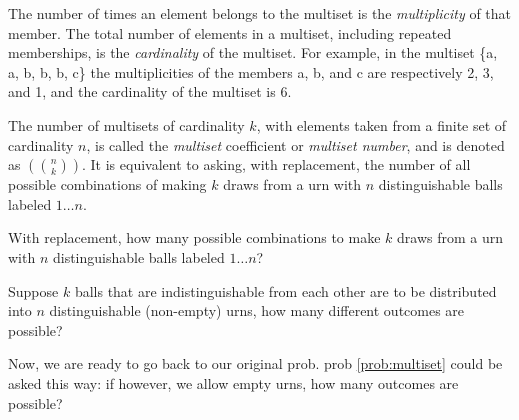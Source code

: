 The number of times an element belongs to the multiset is the {\em{multiplicity}} of that member. The total number of elements in a multiset, including repeated memberships, is the {\em{cardinality}} of the multiset. For example, in the multiset \{a, a, b, b, b, c\} the multiplicities of the members a, b, and c are respectively 2, 3, and 1, and the cardinality of the multiset is 6.

The number of multisets of cardinality $k$, with elements taken from a finite set of cardinality $n$, is called the {\em{multiset}} coefficient or {\em{multiset number}}, and is denoted as $\left(\!\!{n\choose k}\!\!\right)$. It is equivalent to asking, with replacement, the number of all possible combinations of making $k$ draws from a urn with $n$ distinguishable balls labeled $1 \dots n$.

\begin{prob}\label{prob:multiset}
	With replacement, how many possible combinations to make $k$ draws from a urn with $n$ distinguishable balls labeled $1 \dots n$?
\end{prob}

\begin{prob}
	Suppose $k$ balls that are indistinguishable from each other are to be distributed into $n$ distinguishable (non-empty) urns, how many different outcomes are possible?
\end{prob}


Now, we are ready to go back to our original prob. prob \ref{prob:multiset} could be asked this way: if however, we allow empty urns, how many outcomes are possible?


